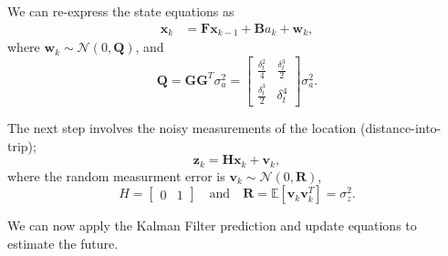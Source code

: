 \documentclass[11pt]{article}
\begin{document}
We can re-express the state equations as
\begin{align}
  \label{eq:state_matrix_eqns2}
  \mathbf{x}_k &= \mathbf{F} \mathbf{x}_{k-1} + \mathbf{B} a_k + \mathbf{w}_k,
\end{align}
where $\mathbf{w}_k \sim \mathcal{N}\left(0,\mathbf{Q}\right)$, and 
\begin{equation}
  \label{eq:systm_variance}
  \mathbf{Q} = \mathbf{G} \mathbf{G}^T \sigma_a^2
  =
  \begin{bmatrix}
    \frac{\delta_t^2}{4} & \frac{\delta_t^3}{2} \\
    \frac{\delta_t^3}{2} & \delta_t^4
  \end{bmatrix} \sigma_a^2.
\end{equation}



The next step involves the noisy measurements of the location (distance-into-trip);
\begin{equation}
  \label{eq:measurements}
  \mathbf{z}_k = \mathbf{H}\mathbf{x}_k + \mathbf{v}_k,
\end{equation}
where the random measurment error is $\mathbf{v}_k \sim \mathcal{N}\left(0, \mathbf{R}\right)$,
\begin{equation}
  \label{eq:moremats}
  H = 
  \begin{bmatrix}
    0 & 1
  \end{bmatrix}
  \quad \text{and} \quad \mathbf{R} = \mathbb{E}\left[\mathbf{v}_k \mathbf{v}_k^T\right] = \sigma_z^2.
\end{equation}


We can now apply the Kalman Filter prediction and update equations to estimate the future.
\end{document}
